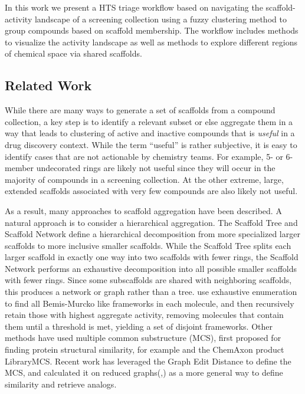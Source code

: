 \documentclass[journal=jacsat,biochem,manuscript=article]{achemso}
\begin{document}
In this work we present a HTS triage workflow based on navigating the
scaffold-activity landscape of a screening collection using a fuzzy
clustering method to group compounds based on scaffold membership. The
workflow includes methods to visualize the activity landscape as well
as methods to explore different regions of chemical space via shared
scaffolds. 

\subsection{Related Work}
While there are many ways to generate a set of scaffolds from a
compound collection, a key step is to identify a relevant subset or else 
aggregate them in a way that leads to clustering of active and inactive 
compounds that is {\it useful} in a drug discovery context. While the term ``useful'' is rather
subjective, it is easy to identify cases that are not actionable by chemistry teams.
For example, 5- or 6-member undecorated rings are likely not useful since they will
occur in the majority of compounds in a screening collection. At the
other extreme, large, extended scaffolds associated with very
few compounds are also likely not useful.

As a result, many approaches to scaffold aggregation have been
described. A natural approach is to consider a hierarchical
aggregation. The Scaffold Tree\cite{Ertl2011ScaffoldTree} and Scaffold
Network\cite{Varin2011ScafNet} define a hierarchical decomposition
from more specialized larger scaffolds to more inclusive smaller
scaffolds. While the Scaffold Tree splits each larger scaffold in
exactly one way into two scaffolds with fewer rings, the Scaffold
Network performs an exhaustive decomposition into all possible smaller
scaffolds with fewer rings.  Since some subscaffolds are shared with
neighboring scaffolds, this produces a network or graph rather than a
tree.  \citet{Harper2004DDclus} use exhaustive enumeration to
find all Bemis-Murcko like frameworks in each molecule, and then
recursively retain those with highest aggregate activity,
removing molecules that contain them until a threshold is met,
yielding a set of disjoint frameworks.  Other methods have used
multiple common substructure (MCS), first proposed for finding protein
structural similarity\cite{Koch1997MCSprot}, for example
\citet{Quintus2009MCS} and the ChemAxon product LibraryMCS. Recent work
has leveraged the Graph Edit Distance to define the MCS\cite{SmallWorld},
and calculated it on reduced graphs(\cite{GH2019GED},\cite{Harper2004DDclus})
as a more general way to define similarity and retrieve analogs.  
\end{document}
